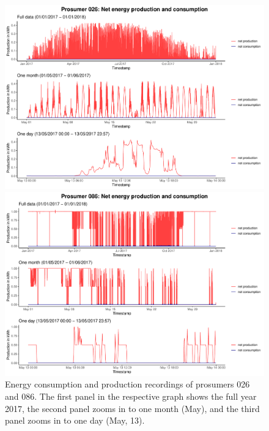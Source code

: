 \begin{figure}
\centering
\begin{minipage}[h]{\dimexpr.5\textwidth-0.15em}
\includegraphics[width=\textwidth]{thesis/graphs/timeseries/p026_prod&cons.pdf}
\end{minipage}
\begin{minipage}[h]{\dimexpr.5\textheight-0.15em}
\includegraphics[width=\textwidth]{thesis/graphs/timeseries/p086_prod&cons.pdf}
\end{minipage}

\caption[Energy consumption and production recordings of prosumers 026 and 086]{Energy consumption and production recordings of prosumers 026 and 086. The first panel in the respective graph shows the full year 2017, the second panel zooms in to one month (May), and the third panel zooms in to one day (May, 13). \quantnet}
\label{Fig:energyconsprod_p026p086}

\end{figure}


